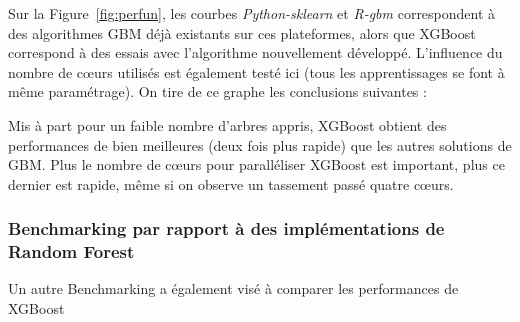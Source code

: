 Sur la Figure~\ref{fig:perfun}, les courbes \textit{Python-sklearn} et \textit{R-gbm} correspondent à des algorithmes GBM déjà existants sur ces plateformes, alors que XGBoost correspond à des essais avec l'algorithme nouvellement développé. L'influence du nombre de c\oe urs utilisés est également testé ici (tous les apprentissages se font à même paramétrage). On tire de ce graphe les conclusions suivantes :\begin{itemize}
Mis à part pour un faible nombre d'arbres appris, XGBoost obtient des performances de bien meilleures (deux fois plus rapide) que les autres solutions de GBM.
Plus le nombre de c\oe urs pour paralléliser XGBoost est important, plus ce dernier est rapide, même si on observe un tassement passé quatre c\oe urs.
\end{itemize}

\subsubsection{Benchmarking par rapport à des implémentations de Random Forest}
Un autre Benchmarking a également visé à comparer les performances de XGBoost 
